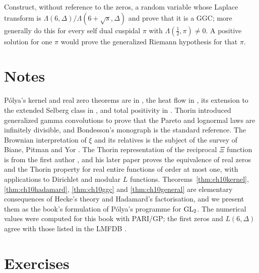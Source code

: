 \begin{problem}
Construct, without reference to the zeros, a random variable whose Laplace transform is $\Lambda(6,\Delta)/\Lambda(6+\sqrt s,\Delta)$ and prove that it is a GGC; more generally do this for every self dual cuspidal $\pi$ with $\Lambda(\frac12,\pi)\ne0$. A positive solution for one $\pi$ would prove the generalized Riemann hypothesis for that $\pi$.
\end{problem}

\section{Notes}

P\'olya's kernel and real zero theorems are in \cite{polya1926,polya1927}, the heat flow in \cite{debruijn1950,newman1976,rodgerstao2020,polymath2019}, its extension to the extended Selberg class in \cite{dobner2021}, and total positivity in \cite{schoenberg1951,karlin1968}. Thorin \cite{thorin1977,thorin1977b} introduced generalized gamma convolutions to prove that the Pareto and lognormal laws are infinitely divisible, and Bondesson's monograph \cite{bondesson1992} is the standard reference. The Brownian interpretation of $\xi$ and its relatives is the subject of the survey of Biane, Pitman and Yor \cite{bpy2001}. The Thorin representation of the reciprocal $\Xi$ function is from the first author \cite{polson2017}, and his later paper \cite{polson2018vdp} proves the equivalence of real zeros and the Thorin property for real entire functions of order at most one, with applications to Dirichlet and modular $L$ functions. Theorems~\ref{thm:ch10kernel}, \ref{thm:ch10hadamard}, \ref{thm:ch10ggc} and \ref{thm:ch10general} are elementary consequences of Hecke's theory and Hadamard's factorisation, and we present them as the book's formulation of P\'olya's programme for $\mathrm{GL}_2$. The numerical values were computed for this book with PARI/GP; the first zeros and $L(6,\Delta)$ agree with those listed in the LMFDB \cite{lmfdb}.

\section{Exercises}

